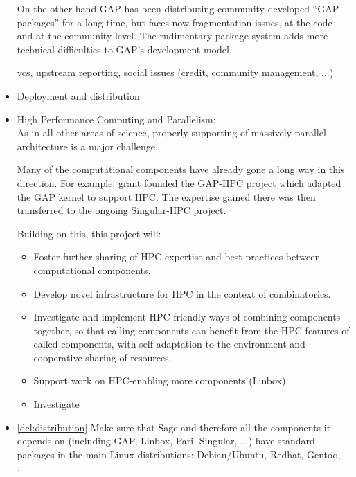 \begin{Workpackage}{\thewpno}
\begin{WPDescription}
\begin{itemize}
    On the other hand GAP has been distributing community-developed
    ``GAP packages'' for a long time, but faces now fragmentation
    issues, at the code and at the community level. The rudimentary
    package system adds more technical difficulties to GAP's
    development model.

    vcs, upstream reporting, social issues (credit, community
    management, ...)


  \item Deployment and distribution

  \item High Performance Computing and Parallelism:\\
    As in all other areas of science, properly supporting of massively
    parallel architecture is a major challenge.

    Many of the computational components have already gone a long way
    in this direction. For example, grant  founded the
    GAP-HPC project which adapted the GAP kernel to support HPC. The
    expertise gained there was then transferred to the ongoing
    Singular-HPC project.

    Building on this, this project will:
    \begin{itemize}
    \item Foster further sharing of HPC expertise and best practices
      between computational components.
    \item Develop novel infrastructure for HPC in the context of
      combinatorics.
    \item Investigate and implement HPC-friendly ways of combining
      components together, so that calling components can benefit from
      the HPC features of called components, with self-adaptation to
      the environment and cooperative sharing of resources.
    \item Support work on HPC-enabling more components (Linbox)
    \item Investigate 
    \end{itemize}
  \end{itemize}
\end{WPDescription}

\begin{WPDeliverables}
\begin{itemize}


\item \ref{del:distribution} Make sure that Sage and therefore all the
  components it depends on (including GAP, Linbox, Pari, Singular,
  ...)  have standard packages in the main Linux distributions:
  Debian/Ubuntu, Redhat, Gentoo, ...


\end{itemize}
\end{WPDeliverables}
\end{Workpackage}
